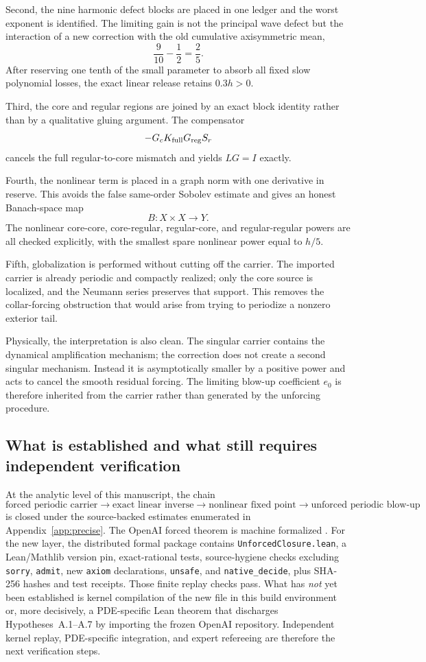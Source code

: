 \documentclass[11pt]{article}
\numberwithin{equation}{section}
\begin{document}
Second, the nine harmonic defect blocks are placed in one ledger and the worst exponent is identified.  The limiting gain is not the principal wave defect but the interaction of a new correction with the old cumulative axisymmetric mean,
\[
\frac9{10}-\frac12=\frac25.
\]
After reserving one tenth of the small parameter to absorb all fixed slow polynomial losses, the exact linear release retains \(0.3h>0\).

Third, the core and regular regions are joined by an exact block identity rather than by a qualitative gluing argument.  The compensator
\[
-G_cK_{\rm full}G_{\rm reg}S_r
\]
cancels the full regular-to-core mismatch and yields \(LG=I\) exactly.

Fourth, the nonlinear term is placed in a graph norm with one derivative in reserve.  This avoids the false same-order Sobolev estimate and gives an honest Banach-space map
\[
B:X\times X\to Y.
\]
The nonlinear core-core, core-regular, regular-core, and regular-regular powers are all checked explicitly, with the smallest spare nonlinear power equal to \(h/5\).

Fifth, globalization is performed without cutting off the carrier.  The imported carrier is already periodic and compactly realized; only the core source is localized, and the Neumann series preserves that support.  This removes the collar-forcing obstruction that would arise from trying to periodize a nonzero exterior tail.

Physically, the interpretation is also clean.  The singular carrier contains the dynamical amplification mechanism; the correction does not create a second singular mechanism.  Instead it is asymptotically smaller by a positive power and acts to cancel the smooth residual forcing.  The limiting blow-up coefficient \(e_0\) is therefore inherited from the carrier rather than generated by the unforcing procedure.

\subsection{What is established and what still requires independent verification}
At the analytic level of this manuscript, the chain
\[
\text{forced periodic carrier}
\longrightarrow
\text{exact linear inverse}
\longrightarrow
\text{nonlinear fixed point}
\longrightarrow
\text{unforced periodic blow-up}
\]
is closed under the source-backed estimates enumerated in Appendix~\ref{app:precise}.  The OpenAI forced theorem is machine formalized \cite{OpenAIRepo2026}.  For the new layer, the distributed formal package contains \texttt{UnforcedClosure.lean}, a Lean/Mathlib version pin, exact-rational tests, source-hygiene checks excluding \texttt{sorry}, \texttt{admit}, new \texttt{axiom} declarations, \texttt{unsafe}, and \texttt{native\_decide}, plus SHA-256 hashes and test receipts.  Those finite replay checks pass.  What has \emph{not} yet been established is kernel compilation of the new file in this build environment or, more decisively, a PDE-specific Lean theorem that discharges Hypotheses~A.1--A.7 by importing the frozen OpenAI repository.  Independent kernel replay, PDE-specific integration, and expert refereeing are therefore the next verification steps.
\end{document}
